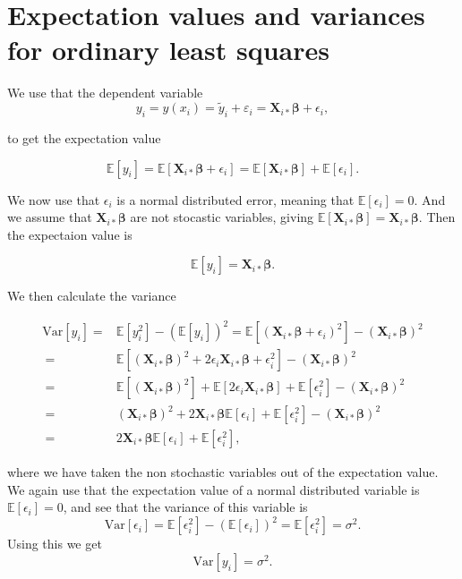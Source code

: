 \appendix
\section{Expectation values and variances for ordinary least squares}\label{app:ols_expactation_variance}

We use that the dependent variable
$$
y_i = y(x_i) = \tilde{y}_i + \varepsilon_i = \mathbf X_{i*}\boldsymbol{\beta} + \epsilon_i,
$$

to get the expectation value



$$
\mathbb{E}[y_i] = \mathbb{E}[\mathbf X_{i*}\boldsymbol{\beta} + \epsilon_i] = \mathbb{E}[\mathbf X_{i*}\boldsymbol{\beta}] + \mathbb{E}[\epsilon_i].
$$

We now use that $\epsilon_i$ is a normal distributed error, meaning that $\mathbb{E}[\epsilon_i]=0$. And we assume that $\mathbf X_{i*}\boldsymbol{\beta}$ are not stocastic variables, giving $\mathbb{E}[\mathbf X_{i*}\boldsymbol{\beta}]=\mathbf X_{i*}\boldsymbol{\beta}$. Then the expectaion value is

\begin{equation}\label{eq:expectation_yi}
\mathbb{E}[y_i] = \mathbf X_{i*}\boldsymbol{\beta}.
\end{equation}

We then calculate the variance


\begin{align*}
\mbox{Var}[y_i] =& \mathbb{E}[y_i^2] - (\mathbb{E}[y_i])^2 = \mathbb{E}[(\mathbf X_{i*}\boldsymbol{\beta} + \epsilon_i)^2]- (\mathbf X_{i*}\boldsymbol{\beta})^2
\\
\ =& \mathbb{E}[(\mathbf X_{i*}\boldsymbol{\beta})^2+2\epsilon_i \mathbf X_{i*}\boldsymbol{\beta}+\epsilon_i^2]-(\mathbf X_{i*}\boldsymbol{\beta})^2
\\
\ =& \mathbb{E}[(\mathbf X_{i*}\boldsymbol{\beta})^2] + \mathbb{E}[2\epsilon_i \mathbf X_{i*}\boldsymbol{\beta}] + \mathbb{E}[\epsilon_i^2]-(\mathbf X_{i*}\boldsymbol{\beta})^2
\\
\ =& (\mathbf X_{i*}\boldsymbol{\beta})^2 + 2\mathbf X_{i*}\boldsymbol{\beta}\mathbb{E}[\epsilon_i ] + \mathbb{E}[\epsilon_i^2]-(\mathbf X_{i*}\boldsymbol{\beta})^2
\\
\ =& 2\mathbf X_{i*}\boldsymbol{\beta}\mathbb{E}[\epsilon_i ] + \mathbb{E}[\epsilon_i^2],
\end{align*}


where we have taken the non stochastic variables out of the expectation value. We again use that the expectation value of a normal distributed variable is $\mathbb{E}[\epsilon_i ]=0$, and see that the variance of this variable is
$$
\mbox{Var}[\epsilon_i]=\mathbb{E}[\epsilon_i^2 ]-(\mathbb{E}[\epsilon_i ])^2=\mathbb{E}[\epsilon_i^2 ]=\sigma^2.
$$
Using this we get
\begin{equation}\label{eq:var_yi}
\mbox{Var}[y_i] = \sigma^2.
\end{equation}



